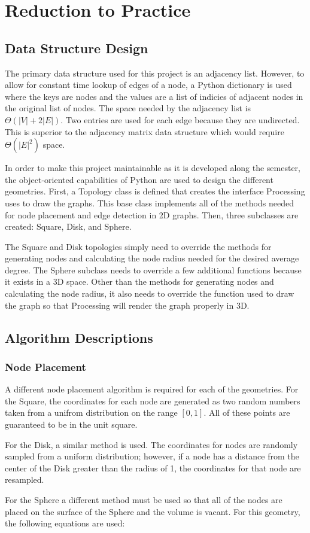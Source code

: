 \documentclass{article}
\begin{document}
\section{Reduction to Practice}

    \subsection{Data Structure Design}
    The primary data structure used for this project is an adjacency list. However, to allow for constant time lookup of edges of a node, a Python dictionary is used where the keys are nodes and the values are a list of indicies of adjacent nodes in the original list of nodes. The space needed by the adjacency list is $\Theta(|V| + 2|E|)$. Two entries are used for each edge because they are undirected. This is superior to the adjacency matrix data structure which would require $\Theta(|E|^2)$ space.
    \par
    In order to make this project maintainable as it is developed along the semester, the object-oriented capabilities of Python are used to design the different geometries. First, a Topology class is defined that creates the interface Processing uses to draw the graphs. This base class implements all of the methods needed for node placement and edge detection in 2D graphs. Then, three subclasses are created: Square, Disk, and Sphere.
    \par
    The Square and Disk topologies simply need to override the methods for generating nodes and calculating the node radius needed for the desired average degree. The Sphere subclass needs to override a few additional functions because it exists in a 3D space. Other than the methods for generating nodes and calculating the node radius, it also needs to override the function used to draw the graph so that Processing will render the graph properly in 3D.

    \subsection{Algorithm Descriptions}

        \subsubsection{Node Placement}
        A different node placement algorithm is required for each of the geometries. For the Square, the coordinates for each node are generated as two random numbers taken from a unifrom distribution on the range $[0,1]$. All of these points are guaranteed to be in the unit square.
        \par
        For the Disk, a similar method is used. The coordinates for nodes are randomly sampled from a uniform distribution; however, if a node has a distance from the center of the Disk greater than the radius of 1, the coordinates for that node are resampled.
        \par
        For the Sphere a different method must be used so that all of the nodes are placed on the surface of the Sphere and the volume is vacant. For this geometry, the following equations are used:
\end{document}
